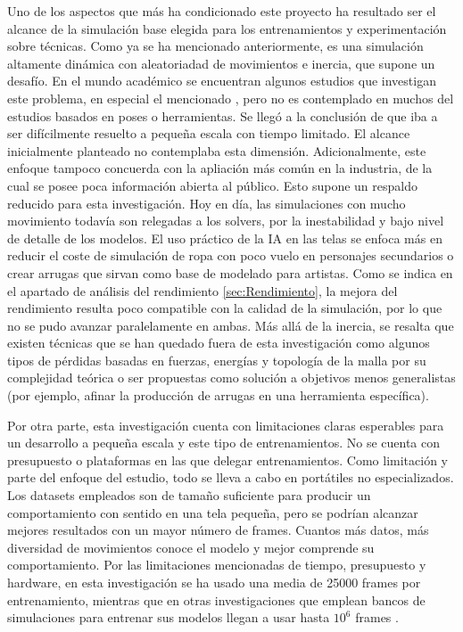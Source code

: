 Uno de los aspectos que más ha condicionado este proyecto ha resultado ser el alcance de la simulación base elegida para los entrenamientos y experimentación sobre técnicas. Como ya se ha mencionado anteriormente, es una simulación altamente dinámica con aleatoriadad de movimientos e inercia, que supone un desafío. En el mundo académico se encuentran algunos estudios que investigan este problema, en especial el mencionado \cite{bertiche2022neural}, pero no es contemplado en muchos del estudios basados en poses o herramientas. Se llegó a la conclusión de que iba a ser difícilmente resuelto a pequeña escala con tiempo limitado. El alcance inicialmente planteado no contemplaba esta dimensión. Adicionalmente, este enfoque tampoco concuerda con la apliación más común en la industria, de la cual se posee poca información abierta al público. Esto supone un respaldo reducido para esta investigación. Hoy en día, las simulaciones con mucho movimiento todavía son relegadas a los solvers, por la inestabilidad y bajo nivel de detalle de los modelos. El uso práctico de la IA en las telas se enfoca más en reducir el coste de simulación de ropa con poco vuelo en personajes secundarios o crear arrugas que sirvan como base de modelado para artistas. Como se indica en el apartado de análisis del rendimiento \ref{sec:Rendimiento}, la mejora del rendimiento resulta poco compatible con la calidad de la simulación, por lo que no se pudo avanzar paralelamente en ambas. Más allá de la inercia, se resalta que existen técnicas que se han quedado fuera de esta investigación como algunos tipos de pérdidas basadas en fuerzas, energías y topología de la malla por su complejidad teórica o ser propuestas como solución a objetivos menos generalistas (por ejemplo, afinar la producción de arrugas en una herramienta específica). \newline

Por otra parte, esta investigación cuenta con limitaciones claras esperables para un desarrollo a pequeña escala y este tipo de entrenamientos. No se cuenta con presupuesto o plataformas en las que delegar entrenamientos. Como limitación y parte del enfoque del estudio, todo se lleva a cabo en portátiles no especializados. Los datasets empleados son de tamaño suficiente para producir un comportamiento con sentido en una tela pequeña, pero se podrían alcanzar mejores resultados con un mayor número de frames. Cuantos más datos, más diversidad de movimientos conoce el modelo y mejor comprende su comportamiento. Por las limitaciones mencionadas de tiempo, presupuesto y hardware, en esta investigación se ha usado una media de 25000 frames por entrenamiento, mientras que en otras investigaciones que emplean bancos de simulaciones para entrenar sus modelos llegan a usar hasta $10^{6}$ frames \cite{holden_subspace_2019}. \newline

